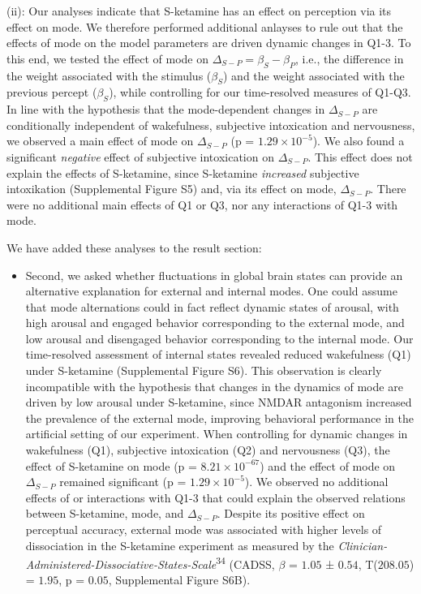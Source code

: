 \documentclass[
]{article}
\providecommand{\tightlist}{%
  \setlength{\itemsep}{0pt}\setlength{\parskip}{0pt}}
\begin{document}
(ii): Our analyses indicate that S-ketamine has an effect on perception
via its effect on mode. We therefore performed additional anlayses to
rule out that the effects of mode on the model parameters are driven
dynamic changes in Q1-3. To this end, we tested the effect of mode on
\(\Delta_{S-P} = \beta_S - \beta_P\), i.e., the difference in the weight
associated with the stimulus (\(\beta_S\)) and the weight associated
with the previous percept (\(\beta_S\)), while controlling for our
time-resolved measures of Q1-Q3. In line with the hypothesis that the
mode-dependent changes in \(\Delta_{S-P}\) are conditionally independent
of wakefulness, subjective intoxication and nervousness, we observed a
main effect of mode on \(\Delta_{S-P}\) (p =
\(\ensuremath{1.29\times 10^{-5}}\)). We also found a significant
\emph{negative} effect of subjective intoxication on \(\Delta_{S-P}\).
This effect does not explain the effects of S-ketamine, since S-ketamine
\emph{increased} subjective intoxikation (Supplemental Figure S5) and,
via its effect on mode, \(\Delta_{S-P}\). There were no additional main
effects of Q1 or Q3, nor any interactions of Q1-3 with mode.

We have added these analyses to the result section:

\begin{itemize}
\tightlist
\item
  Second, we asked whether fluctuations in global brain states can
  provide an alternative explanation for external and internal modes.
  One could assume that mode alternations could in fact reflect dynamic
  states of arousal, with high arousal and engaged behavior
  corresponding to the external mode, and low arousal and disengaged
  behavior corresponding to the internal mode. Our time-resolved
  assessment of internal states revealed reduced wakefulness (Q1) under
  S-ketamine (Supplemental Figure S6). This observation is clearly
  incompatible with the hypothesis that changes in the dynamics of mode
  are driven by low arousal under S-ketamine, since NMDAR antagonism
  increased the prevalence of the external mode, improving behavioral
  performance in the artificial setting of our experiment. When
  controlling for dynamic changes in wakefulness (Q1), subjective
  intoxication (Q2) and nervousness (Q3), the effect of S-ketamine on
  mode (p = \(\ensuremath{8.21\times 10^{-67}}\)) and the effect of mode
  on \(\Delta_{S-P}\) remained significant (p =
  \(\ensuremath{1.29\times 10^{-5}}\)). We observed no additional
  effects of or interactions with Q1-3 that could explain the observed
  relations between S-ketamine, mode, and \(\Delta_{S-P}\). Despite its
  positive effect on perceptual accuracy, external mode was associated
  with higher levels of dissociation in the S-ketamine experiment as
  measured by the
  \emph{Clinician-Administered-Dissociative-States-Scale}\textsuperscript{34}
  (CADSS, \(\beta\) = \(1.05\) ± \(0.54\), T(\(208.05\)) = \(1.95\), p =
  \(0.05\), Supplemental Figure S6B).
\end{itemize}
\end{document}
